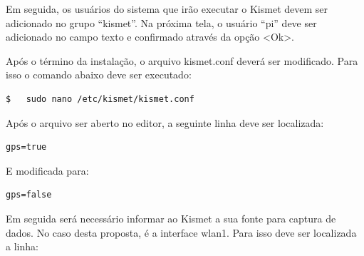 Em seguida, os usuários do sistema que irão executar o Kismet devem ser adicionado no grupo ``kismet''. Na próxima tela, o usuário ``pi'' deve ser adicionado no campo texto e confirmado através da opção <Ok>.

\begin{figure}[h!]
	\centering
\end{figure}

Após o término da instalação, o arquivo kismet.conf deverá ser modificado. Para isso o comando abaixo deve ser executado: \\

\begin{lstlisting}[language=bash]
$   sudo nano /etc/kismet/kismet.conf
\end{lstlisting}

Após o arquivo ser aberto no editor, a seguinte linha deve ser localizada: \\

\begin{lstlisting}
gps=true
\end{lstlisting}

E modificada para: \\

\begin{lstlisting}
gps=false
\end{lstlisting}

Em seguida será necessário informar ao Kismet a sua fonte para captura de dados. No caso desta proposta, é a interface wlan1. Para isso deve ser localizada a linha: \\

